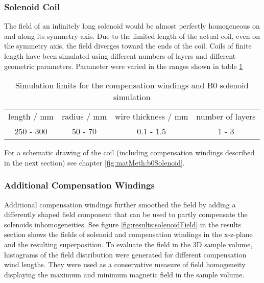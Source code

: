         \subsubsection{Solenoid Coil}
        The field of an infinitely long solenoid would be almost perfectly homogeneous on and along its symmetry axis. Due to the limited length of the actual coil, even on the symmetry axis, the field diverges toward the ends of the coil. Coils of finite length have been simulated using different numbers of layers and different geometric parameters. Parameter were varied in the ranges shown in table \ref{table:simulations:solenoidParameters}
        \begin{table} 
            \centering
            \begin{tabular}{|c|c|c|c|}
                \hline
                length / mm & radius / mm & wire thickness / mm & number of layers \\
                250 - 300 & 50 - 70 & 0.1 - 1.5 & 1 - 3\\
                \hline
            \end{tabular}
            \caption[Solenoid limits]{Simulation limits for the compensation windings and B0 solenoid simulation}
            \label{table:simulations:solenoidParameters}
        \end{table}
        For a schematic drawing of the coil (including compensation windings described in the next section) see chapter \ref{fig:matMeth:b0Solenoid}.

        \subsubsection{Additional Compensation Windings}
        Additional compensation windings further smoothed the field by adding a differently shaped field component that can be used to partly compensate the solenoids inhomogeneities. See figure \ref{fig:results:solenoidField} in the results section shows the fields of solenoid and compensation windings in the x-z-plane and the resulting superposition.
        To evaluate the field in the 3D sample volume, histograms of the field distribution were generated for different compensation wind lengths. They were used as a conservative measure of field homogeneity displaying the maximum and minimum magnetic field in the sample volume.
